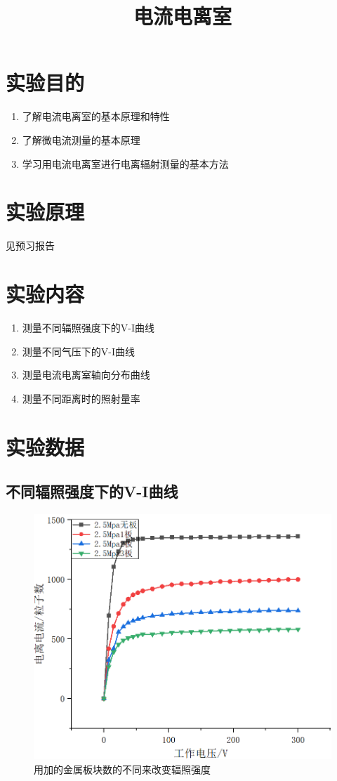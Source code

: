 \documentclass{article}
\title{电流电离室}
\date{}
\begin{document}
    \maketitle
    \section{实验目的}
    \begin{enumerate}
        \item 了解电流电离室的基本原理和特性
        \item 了解微电流测量的基本原理
        \item 学习用电流电离室进行电离辐射测量的基本方法
    \end{enumerate}
    \section{实验原理}
    见预习报告
    \section{实验内容}
    \begin{enumerate}
        \item 测量不同辐照强度下的V-I曲线
        \item 测量不同气压下的V-I曲线
        \item 测量电流电离室轴向分布曲线
        \item 测量不同距离时的照射量率
    \end{enumerate}
    \section{实验数据}
    \subsection{不同辐照强度下的V-I曲线}
    \begin{figure}[htbp]
        \centering
        \includegraphics[scale=0.5]{img/2.png}
        \caption{用加的金属板块数的不同来改变辐照强度}
    \end{figure}
\end{document}
